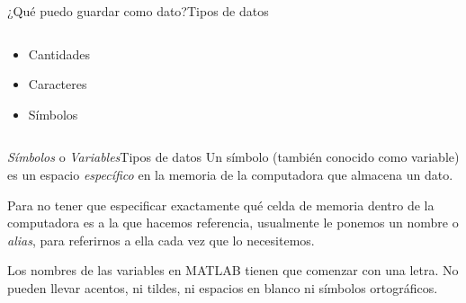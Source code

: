\documentclass[spanish, handout]{beamer}
\begin{document}
\begin{frame}{¿Qué puedo guardar como dato?}{Tipos de datos}

    \begin{columns}
        \begin{column}{0.5\textwidth}
            \begin{itemize}[<+->]
                \itemsep2.5ex
                \item \alert<4>{Cantidades}
                \item \alert<5>{Caracteres}
                \item \alert<6>{Símbolos}
            \end{itemize}
        \end{column}
        \begin{column}{0.5\textwidth}


        \end{column}
    \end{columns}
\end{frame}

\begin{frame}{\textit{Símbolos} o \textit{Variables}}{Tipos de datos}
Un \alert{símbolo} (también conocido como \alert{variable}) es un espacio \textit{específico} en la memoria de la computadora que almacena un dato. \pause

\bigskip

Para no tener que especificar exactamente qué celda de memoria dentro de la computadora es a la que hacemos referencia, usualmente le ponemos un nombre o \textit{alias}, para referirnos a ella cada vez que lo necesitemos. \pause

\bigskip

Los nombres de las variables en MATLAB tienen que comenzar con una letra. No pueden llevar acentos, ni tildes, ni espacios en blanco ni símbolos ortográficos.
\end{frame}
\end{document}
